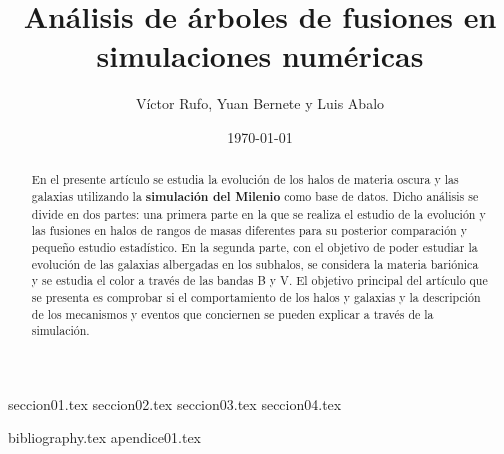 \documentclass[a4paper, amsfonts, amssymb, amsmath, reprint, showkeys, nofootinbib, twoside]{revtex4-1}
\begin{document}
\renewcommand{\tablename}{\textit{Tabla}}
\renewcommand{\figurename}{\textit{Figura}}

\title{Análisis de árboles de fusiones en simulaciones numéricas}

\author{Víctor Rufo, Yuan Bernete y Luis Abalo}

\date{\today} %

\begin{abstract}
En el presente artículo se estudia la evolución de los halos de materia oscura y las galaxias utilizando la \textbf{simulación del Milenio} como base de datos. Dicho análisis se divide en dos partes: una primera parte en la que se realiza el estudio de la evolución y las fusiones en halos de rangos de masas diferentes para su posterior comparación y pequeño estudio estadístico. En la segunda parte, con el objetivo de poder estudiar la evolución de las galaxias albergadas en los subhalos, se considera la materia bariónica y se estudia el color a través de las bandas B y V. El objetivo principal del artículo que se presenta es comprobar si el comportamiento de los halos y galaxias y la descripción de los mecanismos y eventos que conciernen se pueden explicar a través de la simulación.

\end{abstract}


\maketitle


{seccion01.tex} 
{seccion02.tex}
{seccion03.tex}
{seccion04.tex}

{bibliography.tex}
\newpage
{apendice01.tex}
\end{document}

